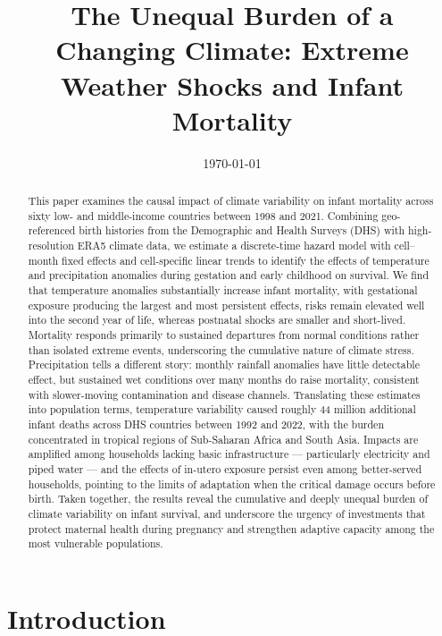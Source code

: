 \documentclass[a4paper]{article}
\title{The Unequal Burden of a Changing Climate: Extreme Weather Shocks and Infant Mortality}
\author{}
\date{\today}
\begin{document}
\maketitle


\begin{abstract}
This paper examines the causal impact of climate variability on infant mortality across sixty low- and middle-income countries between 1998 and 2021. Combining geo-referenced birth histories from the Demographic and Health Surveys (DHS) with high-resolution ERA5 climate data, we estimate a discrete-time hazard model with cell--month fixed effects and cell-specific linear trends to identify the effects of temperature and precipitation anomalies during gestation and early childhood on survival. We find that temperature anomalies substantially increase infant mortality, with gestational exposure producing the largest and most persistent effects, risks remain elevated well into the second year of life, whereas postnatal shocks are smaller and short-lived. Mortality responds primarily to sustained departures from normal conditions rather than isolated extreme events, underscoring the cumulative nature of climate stress. Precipitation tells a different story: monthly rainfall anomalies have little detectable effect, but sustained wet conditions over many months do raise mortality, consistent with slower-moving contamination and disease channels. Translating these estimates into population terms, temperature variability caused roughly 44 million additional infant deaths across DHS countries between 1992 and 2022, with the burden concentrated in tropical regions of Sub-Saharan Africa and South Asia. Impacts are amplified among households lacking basic infrastructure — particularly electricity and piped water — and the effects of in-utero exposure persist even among better-served households, pointing to the limits of adaptation when the critical damage occurs before birth. Taken together, the results reveal the cumulative and deeply unequal burden of climate variability on infant survival, and underscore the urgency of investments that protect maternal health during pregnancy and strengthen adaptive capacity among the most vulnerable populations.
\end{abstract}

\newpage

\section{Introduction} \label{sec:introduction}
\end{document}

